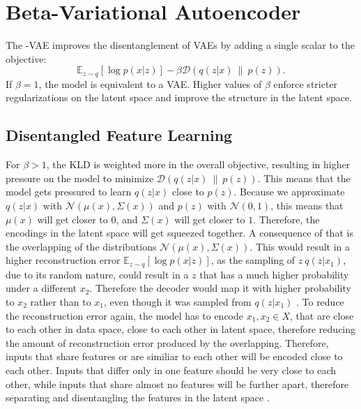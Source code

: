 \documentclass[a4paper]{IEEEtran}
\begin{document}
{\section{Beta-Variational Autoencoder}
The \textbeta -VAE improves the disentanglement of VAEs by adding a single scalar to the objective:
\begin{equation}
	\mathbb{E}_{z \sim q}\left[ \log p(x|z) \right] - \beta \mathcal{D}(q(z|x) \ \| \ p(z)).
\end{equation}
If $\beta = 1$, the model is equivalent to a VAE. Higher values of $\beta$ enforce stricter regularizations on the latent space and improve the structure in the latent space. 

\subsection{Disentangled Feature Learning}
For $\beta > 1$, the KLD is weighted more in the overall objective, resulting in higher pressure on the model to minimize $\mathcal{D}(q(z|x) \ \| \ p(z))$. This means that the model gets pressured to learn $q(z|x)$ close to $p(z)$. Because we approximate $q(z|x)$ with $\mathcal{N}(\mu(x), \Sigma(x))$ and $p(z)$ with $\mathcal{N}(0, 1)$, this means that $\mu(x)$ will get closer to $0$, and $\Sigma(x)$ will get closer to $1$. Therefore, the encodings in the latent space will get squeezed together. A consequence of that is the overlapping of the distributions $\mathcal{N}(\mu(x), \Sigma(x))$. This would result in a higher reconstruction error $\mathbb{E}_{z \sim q}\left[ \log p(x|z) \right]$, as the sampling of $z ~ q(z|x_1)$, due to its random nature, could result in a $z$ that has a much higher probability under a different $x_2$. Therefore the decoder would map it with higher probability to $x_2$ rather than to $x_1$, even though it was sampled from $q(z|x_1)$ \cite{burgess2018understanding}. To reduce the reconstruction error again, the model has to encode $x_1, x_2 \in X$, that are close to each other in data space, close to each other in latent space, therefore reducing the amount of reconstruction error produced by the overlapping. Therefore, inputs that share features or are similiar to each other will be encoded close to each other. Inputs that differ only in one feature should be very close to each other, while inputs that share almost no features will be further apart, therefore separating and disentangling the features in the latent space \cite{burgess2018understanding}.


}
\end{document}
